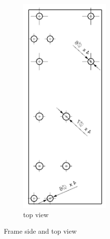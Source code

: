 \documentclass[a4paper,12pt]{scrreprt}
\begin{document}
\begin{figure} [H]
\begin{subfigure}[b]{0.35\textwidth}
                \includegraphics[width=0.5\textwidth]{pictures/frame_2}
                \caption{top view}\label{fig:frame top view}
        \end{subfigure}
        \caption[Frame side and top view]{Frame side and top view}\label{fig:side and top view}
  \end{figure}
\end{document}
